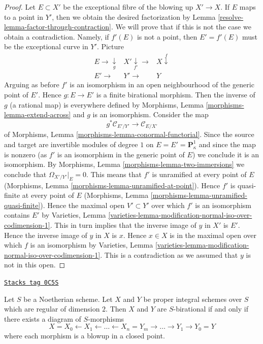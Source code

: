 \begin{proof}
\medskip\noindent
Let $E \subset X'$ be the exceptional fibre of the blowing up
$X' \to X$. If $E$ maps to a point in $Y'$, then we obtain the
desired factorization by Lemma \ref{resolve-lemma-factor-through-contraction}.
We will prove that
if this is not the case we obtain a contradiction. Namely,
if $f'(E)$ is not a point, then
$E' = f'(E)$ must be the exceptional curve in $Y'$.
Picture
$$
\begin{array}{ccc}E \longrightarrow\underset{g}{\downarrow} & X' \underset{f'}{\downarrow}\longrightarrow & X \overset{f}{\downarrow} \\ E' \longrightarrow & Y' \longrightarrow & Y\end{array}
$$
Arguing as before $f'$ is an isomorphism in an open neighbourhood
of the generic point of $E'$. Hence $g : E \to E'$ is a finite birational
morphism. Then the inverse of $g$ (a rational map) is everywhere defined
by Morphisms, Lemma \ref{morphisms-lemma-extend-across} and $g$ is
an isomorphism. Consider the map
$$
g^*\mathcal{C}_{E'/Y'} \longrightarrow \mathcal{C}_{E/X'}
$$
of Morphisms, Lemma \ref{morphisms-lemma-conormal-functorial}.
Since the source and target are invertible modules of degree $1$
on $E = E' = \mathbf{P}^1_\kappa$ and since the map is
nonzero (as $f'$ is an isomorphism in the generic point of $E$)
we conclude it is an isomorphism. By
Morphisms, Lemma \ref{morphisms-lemma-two-immersions}
we conclude that $\Omega_{X'/Y'}|_E = 0$.
This means that $f'$ is unramified at every point of $E$
(Morphisms, Lemma \ref{morphisms-lemma-unramified-at-point}).
Hence $f'$ is quasi-finite at every point of $E$
(Morphisms, Lemma \ref{morphisms-lemma-unramified-quasi-finite}).
Hence the maximal open $V' \subset Y'$ over which $f'$ is an
isomorphism contains $E'$ by Varieties, Lemma
\ref{varieties-lemma-modification-normal-iso-over-codimension-1}.
This in turn implies that the inverse image of $y$ in
$X'$ is $E'$. Hence the inverse image of $y$ in $X$ is $x$.
Hence $x \in X$ is in the maximal open over which
$f$ is an isomorphism by Varieties, Lemma
\ref{varieties-lemma-modification-normal-iso-over-codimension-1}.
This is a contradiction as we assumed that $y$ is not
in this open.
\end{proof}

\begin{lemma}
\label{resolve-lemma-birational-regular-surfaces}
\href{https://stacks.math.columbia.edu/tag/0C5S}{\texttt{Stacks tag 0C5S}}

Let $S$ be a Noetherian scheme. Let $X$ and $Y$ be proper
integral schemes over $S$ which are regular of dimension $2$.
Then $X$ and $Y$ are $S$-birational if and only if there
exists a diagram of $S$-morphisms
$$
X = X_0 \leftarrow X_1 \leftarrow \ldots \leftarrow X_n = Y_m
\to \ldots \to Y_1 \to Y_0 = Y
$$
where each morphism is a blowup in a closed point.
\end{lemma}


